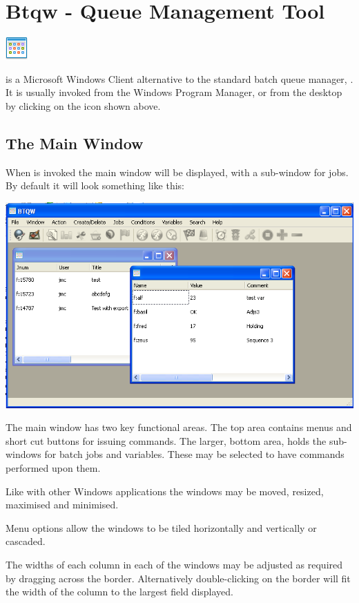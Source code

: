 \chapter{Btqw - Queue Management Tool}
\label{chp:btqw}
\includegraphics{img/win2.png} 

 is a Microsoft Windows Client alternative to the
standard batch queue manager, \PrBtq. It is usually
invoked from the Windows Program Manager, or from the desktop by
clicking on the  icon shown above.

\section{The Main Window}
When  is invoked the main window will be
displayed, with a sub-window for jobs. By default it will look
something like this:

\includegraphics{img/btqwjwfirst.png} 

The main window has two key functional areas. The top area contains
menus and short cut buttons for issuing commands. The larger, bottom
area, holds the sub-windows for batch jobs and variables. These may be
selected to have commands performed upon them.

Like with other Windows applications the windows may be moved, resized, maximised and minimised.

Menu options allow the windows to be tiled horizontally and vertically or cascaded.

The widths of each column in each of the windows may be adjusted as required by dragging across the border. Alternatively double-clicking
on the border will fit the width of the column to the largest field displayed.

